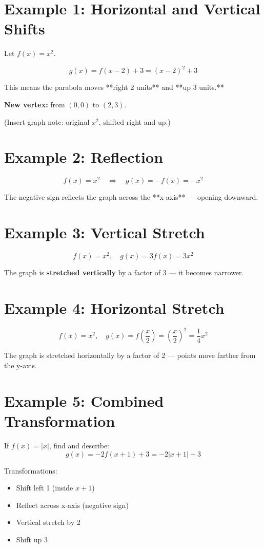 \documentclass[12pt]{article}
\begin{document}
\section*{Example 1: Horizontal and Vertical Shifts}

Let \(f(x) = x^2.\)

\[
g(x) = f(x - 2) + 3 = (x - 2)^2 + 3
\]

This means the parabola moves **right 2 units** and **up 3 units.**

\textbf{New vertex:} from \((0,0)\) to \((2,3)\).

(Insert graph note: original \(x^2\), shifted right and up.)

\section*{Example 2: Reflection}

\[
f(x) = x^2 \quad \Rightarrow \quad g(x) = -f(x) = -x^2
\]

The negative sign reflects the graph across the **x-axis** — opening downward.

\section*{Example 3: Vertical Stretch}

\[
f(x) = x^2, \quad g(x) = 3f(x) = 3x^2
\]

The graph is \textbf{stretched vertically} by a factor of 3 — it becomes narrower.

\section*{Example 4: Horizontal Stretch}

\[
f(x) = x^2, \quad g(x) = f\left(\frac{x}{2}\right) = \left(\frac{x}{2}\right)^2 = \frac{1}{4}x^2
\]

The graph is stretched horizontally by a factor of 2 — points move farther from the y-axis.

\section*{Example 5: Combined Transformation}

If \(f(x) = |x|\), find and describe:
\[
g(x) = -2f(x + 1) + 3 = -2|x + 1| + 3
\]

Transformations:
\begin{itemize}
  \item Shift left 1 (inside \(x + 1\))
  \item Reflect across x-axis (negative sign)
  \item Vertical stretch by 2
  \item Shift up 3
\end{itemize}
\end{document}
